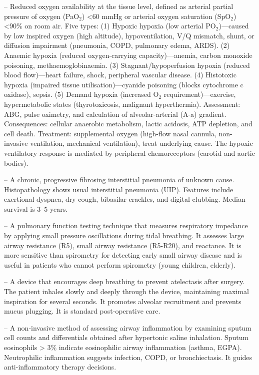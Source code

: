 -- Reduced oxygen availability at the tissue level, defined as arterial partial pressure of oxygen (PaO$_2$) <60 mmHg or arterial oxygen saturation (SpO$_2$) <90\% on room air. Five types: (1) Hypoxic hypoxia (low arterial PO$_2$)—caused by low inspired oxygen (high altitude), hypoventilation, V/Q mismatch, shunt, or diffusion impairment (pneumonia, COPD, pulmonary edema, ARDS). (2) Anaemic hypoxia (reduced oxygen-carrying capacity)—anemia, carbon monoxide poisoning, methaemoglobinaemia. (3) Stagnant/hypoperfusion hypoxia (reduced blood flow)—heart failure, shock, peripheral vascular disease. (4) Histotoxic hypoxia (impaired tissue utilisation)—cyanide poisoning (blocks cytochrome c oxidase), sepsis. (5) Demand hypoxia (increased O$_2$ requirement)—exercise, hypermetabolic states (thyrotoxicosis, malignant hyperthermia). Assessment: ABG, pulse oximetry, and calculation of alveolar-arterial (A-a) gradient. Consequences: cellular anaerobic metabolism, lactic acidosis, ATP depletion, and cell death. Treatment: supplemental oxygen (high-flow nasal cannula, non-invasive ventilation, mechanical ventilation), treat underlying cause. The hypoxic ventilatory response is mediated by peripheral chemoreceptors (carotid and aortic bodies).

-- A chronic, progressive fibrosing interstitial pneumonia of unknown cause. Histopathology shows usual interstitial pneumonia (UIP). Features include exertional dyspnea, dry cough, bibasilar crackles, and digital clubbing. Median survival is 3--5 years.

-- A pulmonary function testing technique that measures respiratory impedance by applying small pressure oscillations during tidal breathing. It assesses large airway resistance (R5), small airway resistance (R5-R20), and reactance. It is more sensitive than spirometry for detecting early small airway disease and is useful in patients who cannot perform spirometry (young children, elderly).

-- A device that encourages deep breathing to prevent atelectasis after surgery. The patient inhales slowly and deeply through the device, maintaining maximal inspiration for several seconds. It promotes alveolar recruitment and prevents mucus plugging. It is standard post-operative care.

-- A non-invasive method of assessing airway inflammation by examining sputum cell counts and differentials obtained after hypertonic saline inhalation. Sputum eosinophils > 3\% indicate eosinophilic airway inflammation (asthma, EGPA). Neutrophilic inflammation suggests infection, COPD, or bronchiectasis. It guides anti-inflammatory therapy decisions.

